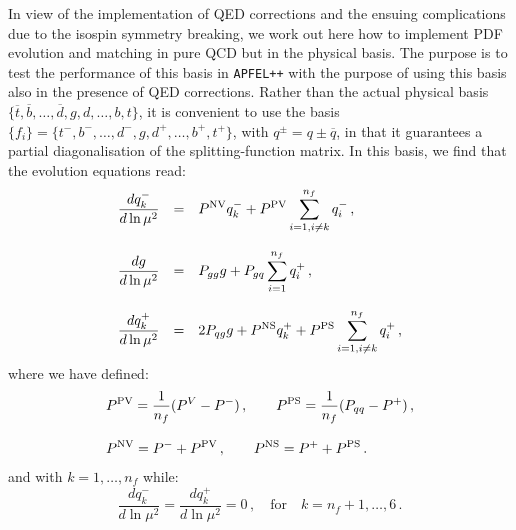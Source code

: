\documentclass[10pt,a4paper]{article}
\begin{document}
In view of the implementation of QED corrections and the ensuing
complications due to the isospin symmetry breaking, we work out here
how to implement PDF evolution and matching in pure QCD but in the
physical basis. The purpose is to test the performance of this basis
in {\tt APFEL++} with the purpose of using this basis also in the
presence of QED corrections. Rather than the actual physical basis
$\{\overline{t}, \overline{b},\dots, \overline{d},g,d,\dots,b,t\}$, it
is convenient to use the basis
$\{f_i\}=\{t^-,b^-,\dots,d^-,g,d^+,\dots,b^+,t^+\}$, with
$q^{\pm} = q\pm\overline{q}$, in that it guarantees a partial
diagonalisation of the splitting-function matrix. In this basis, we
find that the evolution equations read:
\begin{equation}
\begin{array}{rcl}\displaystyle\frac{dq_k^-}{d\ln\mu^2} &=&
                                                            \displaystyle
                                                            P^{\rm
                                                            NV}q_k^-+P^{\rm
                                                            PV}\sum_{i=1,i\neq
                                                            k}^{n_f} q_i^-\,,\\
\\
\displaystyle\frac{dg}{d\ln\mu^2} &=&\displaystyle P_{gg} g+ P_{gq}
                                      \sum_{i=1}^{n_f} q_i^+\,,\\
\\
\displaystyle\frac{dq_k^+}{d\ln\mu^2} &=& \displaystyle 2P_{qg}
                                          g+P^{\rm
                                          NS}q_k^++P^{\rm
                                          PS}\sum_{i=1,i\neq k}^{n_f} q_i^+\,,
\end{array}
\end{equation}
where we have defined:
\begin{equation}
\begin{array}{l}
\displaystyle P^{\rm PV} = \frac{1}{n_f}(P^V-P^-)\,,\qquad P^{\rm PS} =
\frac{1}{n_f}(P_{qq}-P^+)\,,\\
\\
\displaystyle  P^{\rm NV} = P^-+P^{\rm PV}\,,\qquad P^{\rm NS} = P^++P^{\rm PS}\,.
\end{array}
\end{equation}
and with $k=1,\dots,n_f$ while:
\begin{equation}
\frac{dq_k^-}{d\ln\mu^2}=\frac{dq_k^+}{d\ln\mu^2} =
0\,,\quad\mbox{for}\quad k=n_f+1,\dots,6\,.
\end{equation}
\end{document}
